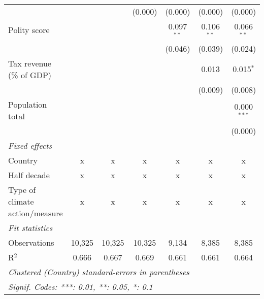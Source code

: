 \begin{tabular}{lcccccc}
                                                                          &               &               & (0.000)        & (0.000)        & (0.000)        & (0.000)\\   
   Polity score                                                           &               &               &                & 0.097$^{**}$   & 0.106$^{**}$   & 0.066$^{**}$\\   
                                                                          &               &               &                & (0.046)        & (0.039)        & (0.024)\\   
   Tax revenue (\% of GDP)                                                &               &               &                &                & 0.013          & 0.015$^{*}$\\   
                                                                          &               &               &                &                & (0.009)        & (0.008)\\   
   Population total                                                       &               &               &                &                &                & 0.000$^{***}$\\   
                                                                          &               &               &                &                &                & (0.000)\\   
   \emph{Fixed effects}\\
   Country                                                                & x             & x             & x              & x              & x              & x\\  
   Half decade                                                            & x             & x             & x              & x              & x              & x\\  
   Type of climate action/measure                                         & x             & x             & x              & x              & x              & x\\  
   \midrule \emph{Fit statistics}\\
   Observations                                                           & 10,325        & 10,325        & 10,325         & 9,134          & 8,385          & 8,385\\  
   R$^2$                                                                  & 0.666         & 0.667         & 0.669          & 0.661          & 0.661          & 0.664\\  
   \midrule
   \multicolumn{7}{l}{\emph{Clustered (Country) standard-errors in parentheses}}\\
   \multicolumn{7}{l}{\emph{Signif. Codes: ***: 0.01, **: 0.05, *: 0.1}}\\
\end{tabular}
\par\endgroup


